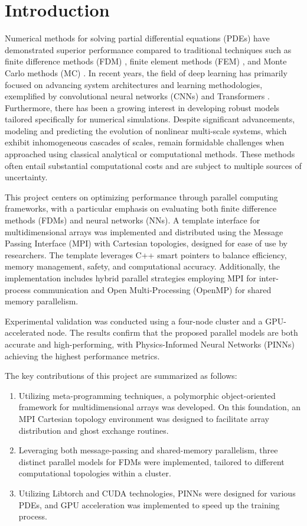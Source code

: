 \section{Introduction}

Numerical methods for solving partial differential equations (PDEs) 
have demonstrated superior performance compared to traditional techniques 
such as finite difference methods (FDM) \cite{GermundNMSCV1P122}, 
finite element methods (FEM) \cite{GermundNMSCV1P122}, 
and Monte Carlo methods (MC) \cite{Monte_Carlo_Method}. 
In recent years, the field of deep learning has primarily focused on advancing system architectures and learning methodologies, exemplified by 
convolutional neural networks (CNNs) \cite{CNN} 
and Transformers \cite{Transformer_PINN}. 
Furthermore, there has been a growing interest in developing robust models tailored specifically for numerical simulations.
Despite significant advancements, 
modeling and predicting the evolution of nonlinear multi-scale systems, 
which exhibit inhomogeneous cascades of scales, 
remain formidable challenges when approached using classical analytical or computational methods. 
These methods often entail substantial computational costs and are subject to multiple sources of uncertainty.

This project centers on optimizing performance through parallel computing frameworks, 
with a particular emphasis on evaluating both finite difference methods (FDMs) and neural networks (NNs). 
A template interface for multidimensional arrays was implemented and distributed using the 
Message Passing Interface (MPI) \cite{MPI} with Cartesian topologies, designed for ease of use by researchers. 
The template leverages C++ smart pointers to balance efficiency, memory management, safety, and computational accuracy. 
Additionally, the implementation includes hybrid parallel strategies employing MPI for inter-process communication and 
Open Multi-Processing (OpenMP) \cite{OpenMP} for shared memory parallelism.

Experimental validation was conducted using a four-node cluster and a GPU-accelerated node. 
The results confirm that the proposed parallel models are both accurate and high-performing, 
with Physics-Informed Neural Networks (PINNs) \cite{PINN} achieving the highest performance metrics.

The key contributions of this project are summarized as follows:
\begin{enumerate}
\item Utilizing meta-programming techniques, a polymorphic object-oriented framework for multidimensional arrays was developed. On this foundation, an MPI Cartesian topology environment was designed to facilitate array distribution and ghost exchange routines.
\item Leveraging both message-passing and shared-memory parallelism, three distinct parallel models for FDMs were implemented, tailored to different computational topologies within a cluster.
\item Utilizing Libtorch and CUDA technologies, PINNs were designed for various PDEs, and GPU acceleration was implemented to speed up the training process.
\end{enumerate}